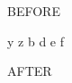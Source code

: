 \documentclass{article}
\begin{document}
BEFORE
\begin{algorithmic}
\Foo
    \State y
  \EndBar
    \State z
  \EndFor
    \State b
    \State d
  \Else
    \State e
  \EndIf
  \Baz
    \State f
  \EndBaz
\EndFoo
\end{algorithmic}
AFTER
\end{document}
